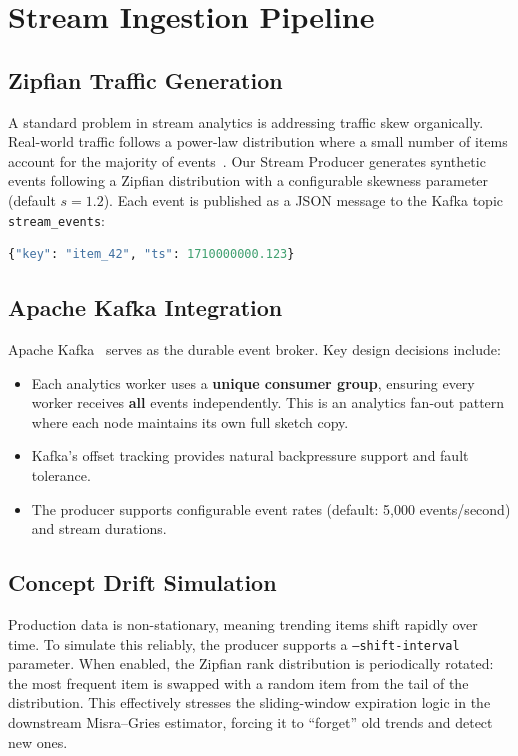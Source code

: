 \section{Stream Ingestion Pipeline}

\subsection{Zipfian Traffic Generation}
A standard problem in stream analytics is addressing traffic skew organically. Real-world traffic follows a power-law distribution where a small number of items account for the majority of events~\cite{zipf}. Our Stream Producer generates synthetic events following a Zipfian distribution with a configurable skewness parameter (default $s = 1.2$). Each event is published as a JSON message to the Kafka topic \texttt{stream\_events}:

\begin{lstlisting}[language=Python, caption=Sample event format published to Kafka.]
{"key": "item_42", "ts": 1710000000.123}
\end{lstlisting}

\subsection{Apache Kafka Integration}
Apache Kafka~\cite{kafka} serves as the durable event broker. Key design decisions include:
\begin{itemize}
    \item Each analytics worker uses a \textbf{unique consumer group}, ensuring every worker receives \textbf{all} events independently. This is an analytics fan-out pattern where each node maintains its own full sketch copy.
    \item Kafka's offset tracking provides natural backpressure support and fault tolerance.
    \item The producer supports configurable event rates (default: 5,000 events/second) and stream durations.
\end{itemize}

\subsection{Concept Drift Simulation}
Production data is non-stationary, meaning trending items shift rapidly over time. To simulate this reliably, the producer supports a \texttt{--shift-interval} parameter. When enabled, the Zipfian rank distribution is periodically rotated: the most frequent item is swapped with a random item from the tail of the distribution. This effectively stresses the sliding-window expiration logic in the downstream Misra--Gries estimator, forcing it to ``forget'' old trends and detect new ones.

